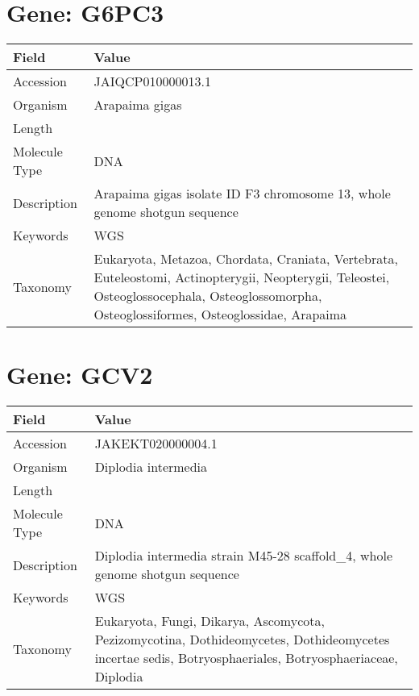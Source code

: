 \documentclass[10pt]{article}
\begin{document}
\section*{Gene: G6PC3}
{\footnotesize
\begin{longtable}{>{\raggedright\arraybackslash}p{4.5cm} >{\raggedright\arraybackslash}p{11.5cm}}
\textbf{Field} & \textbf{Value} \\
\hline
Accession & JAIQCP010000013.1 \\
Organism & Arapaima gigas \\
Length & 24166628 \\
Molecule Type & DNA \\
Description & Arapaima gigas isolate ID F3 chromosome 13, whole genome shotgun sequence \\
Keywords & WGS \\
Taxonomy & Eukaryota, Metazoa, Chordata, Craniata, Vertebrata, Euteleostomi, Actinopterygii, Neopterygii, Teleostei, Osteoglossocephala, Osteoglossomorpha, Osteoglossiformes, Osteoglossidae, Arapaima \\
\end{longtable}
}


\section*{Gene: GCV2}
{\footnotesize
\begin{longtable}{>{\raggedright\arraybackslash}p{4.5cm} >{\raggedright\arraybackslash}p{11.5cm}}
\textbf{Field} & \textbf{Value} \\
\hline
Accession & JAKEKT020000004.1 \\
Organism & Diplodia intermedia \\
Length & 742941 \\
Molecule Type & DNA \\
Description & Diplodia intermedia strain M45-28 scaffold\_4, whole genome shotgun sequence \\
Keywords & WGS \\
Taxonomy & Eukaryota, Fungi, Dikarya, Ascomycota, Pezizomycotina, Dothideomycetes, Dothideomycetes incertae sedis, Botryosphaeriales, Botryosphaeriaceae, Diplodia \\
\end{longtable}
}
\end{document}
